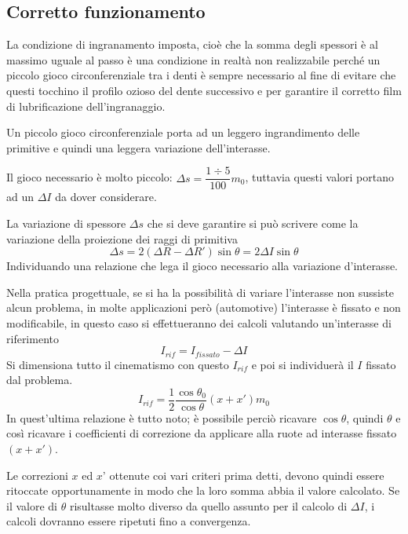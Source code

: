 \documentclass[a4paper, 15pt]{article}
\begin{document}
\subsection{Corretto funzionamento}
\begin{adjustwidth}{2in}{}	
	La condizione di ingranamento imposta, cioè che la somma degli spessori è al massimo uguale al passo è una condizione in realtà non realizzabile perché un piccolo gioco circonferenziale tra i denti è sempre necessario al fine di evitare che questi tocchino il profilo ozioso del dente successivo e per garantire il corretto film di lubrificazione dell'ingranaggio. \newline 
	
	Un piccolo gioco circonferenziale porta ad un leggero ingrandimento delle primitive e quindi una leggera variazione dell'interasse. 
	
	Il gioco necessario è molto piccolo: $\Delta s = \dfrac{1\div5}{100}m_0$, tuttavia questi valori portano ad un $\Delta I$ da dover considerare. \newline 
	
	La variazione di spessore $\Delta s$ che si deve garantire si può scrivere come la variazione della proiezione dei raggi di primitiva
	\[\Delta s = 2(\Delta R - \Delta R')\sin\theta = 2\Delta I\sin\theta\]
	Individuando una relazione che lega il gioco necessario alla variazione d'interasse. \newline 
	
	Nella pratica progettuale, se si ha la possibilità di variare l'interasse non sussiste alcun problema, in molte applicazioni però (automotive) l'interasse è fissato e non modificabile, in questo caso si effettueranno dei calcoli valutando un'interasse di riferimento 
	\[I_{rif} = I_{fissato} - \Delta I\] 
	Si dimensiona tutto il cinematismo con questo $I_{rif}$ e poi si individuerà il $I$ fissato dal problema.
	\[I_{rif} = \dfrac{1}{2}\dfrac{\cos\theta_0}{\cos\theta}(x+x')m_0\]
	In quest'ultima relazione è tutto noto; è possibile perciò ricavare $\cos\theta$, quindi $\theta$ e così ricavare i coefficienti di correzione da applicare alla ruote ad interasse fissato $(x + x')$. 
	
	Le correzioni $x$ ed $x$’ ottenute coi vari criteri prima detti, devono quindi essere ritoccate opportunamente in modo che la loro somma abbia il valore calcolato. Se il valore di $\theta$ risultasse molto diverso da quello assunto per il calcolo di $\Delta I$, i calcoli dovranno essere ripetuti fino a convergenza.
\end{adjustwidth}
\end{document}

